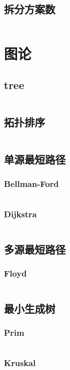 \documentclass[a4paper,11pt]{article}
\begin{document}
\subsection{拆分方案数}
\inputminted[breaklines]{c++}{dp/split_scheme.cpp}

\section{图论}
\subsection{tree}
\inputminted[breaklines]{c++}{graph/tree.h}
\subsection{拓扑排序}
\inputminted[breaklines]{c++}{graph/topoord.cpp}
\subsection{单源最短路径}
\subsubsection{Bellman-Ford}
\inputminted[breaklines]{c++}{graph/bellman.cpp}
\subsubsection{Dijkstra}
\inputminted[breaklines]{c++}{graph/dijkstra.cpp}

\subsection{多源最短路径}
\subsubsection{Floyd}
\inputminted[breaklines]{c++}{graph/floyd.cpp}

\subsection{最小生成树} 
\subsubsection{Prim} 
\inputminted[breaklines]{c++}{graph/prim.cpp}
\subsubsection{Kruskal} 
\inputminted[breaklines]{c++}{graph/kruskal.cpp}
\end{document}
